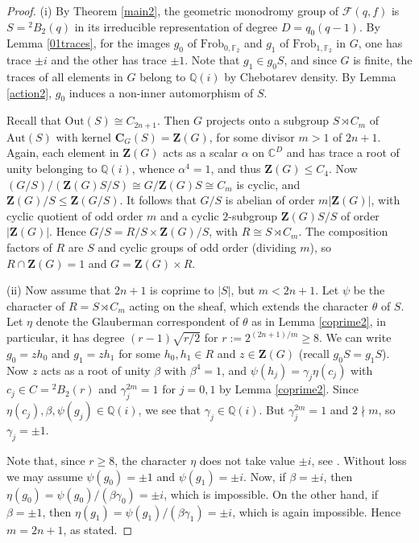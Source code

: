 \documentclass[11pt]{amsart}
\theoremstyle{plain}
\theoremstyle{definition}
\numberwithin{thm}{section}
\numberwithin{equation}{thm}
\newcommand{\al}{\alpha}
\newcommand{\Aut}{\mathrm{Aut}}
\newcommand{\Out}{\mathrm{Out}}
\newcommand{\sF}{{\mathcal F}}
\newcommand{\C}{{\mathbb C}}
\newcommand{\F}{{\mathbb F}}
\newcommand{\Q}{{\mathbb Q}}
\newcommand{\0}{\emptyset}
\newcommand{\ZB}{{\mathbf Z}}
\newcommand{\CB}{{\mathbf C}}
\newcommand{\tw}[1]{{}^#1\!}
\newcommand{\Frob}{\mathrm{Frob}}
\begin{document}
\begin{proof}
(i) By Theorem \ref{main2}, the geometric monodromy group of $\sF(q,f)$ is $S = \tw2 B_2(q)$ in its irreducible representation 
of degree $D=q_0(q-1)$. By Lemma \ref{01traces}, for the images $g_0$ of $\Frob_{0,\F_2}$ and $g_1$ of $\Frob_{1,\F_2}$ in
$G$, one has trace $\pm i$ and the other has trace $\pm 1$. Note that $g_1 \in g_0S$, and since $G$ is finite,
the traces of all elements in $G$ belong to $\Q(i)$ by Chebotarev density. 
By Lemma \ref{action2}, $g_0$ induces a non-inner automorphism of $S$. 

Recall that $\Out(S) \cong C_{2n+1}$. Then $G$ projects onto a subgroup $S \rtimes C_m$ of $\Aut(S)$ with kernel
$\CB_G(S) = \ZB(G)$, for some divisor $m > 1$ of $2n+1$. 
Again, each element in $\ZB(G)$ acts as a scalar $\al$ on $\C^D$ and has trace a root of unity belonging to 
$\Q(i)$, whence $\al^4=1$, and thus $\ZB(G) \leq C_4$. Now $(G/S)/(\ZB(G)S/S) \cong G/\ZB(G)S \cong C_m$ is cyclic, and 
$\ZB(G)/S \leq \ZB(G/S)$. It follows that $G/S$ is abelian of order $m|\ZB(G)|$, with cyclic quotient of odd order $m$ and 
a cyclic $2$-subgroup $\ZB(G)S/S$ of order $|\ZB(G)|$. Hence $G/S = R/S \times \ZB(G)/S$, with $R \cong S \rtimes C_m$.
The composition factors of $R$ are $S$ and cyclic groups of odd order (dividing $m$), so $R \cap \ZB(G)=1$ and 
$G = \ZB(G) \times R$.

\smallskip
(ii) Now assume that $2n+1$ is coprime to $|S|$, but $m < 2n+1$. Let $\psi$ be the character of $R = S \rtimes C_m$ 
acting on the sheaf, which extends the character $\theta$ of $S$. Let $\eta$ denote the Glauberman correspondent of $\theta$
as in Lemma \ref{coprime2}, in particular, it has degree $(r-1)\sqrt{r/2}$ for $r:=2^{(2n+1)/m} \geq 8$. 
We can write $g_0 = zh_0$ and $g_1 = zh_1$ for some $h_0,h_1 \in R$ and $z \in \ZB(G)$
(recall $g_0S=g_1S$). Now $z$ acts as a root of unity $\beta$ with $\beta^4=1$, and $\psi(h_j) = \gamma_j\eta(c_j)$ with
$c_j \in C = \tw2 B_2(r)$ and $\gamma_j^{2m}=1$ for $j= 0,1$ by Lemma \ref{coprime2}. Since $\eta(c_j),\beta,\psi(g_j) \in \Q(i)$, 
we see that $\gamma_j \in \Q(i)$. But $\gamma_j^{2m}=1$ and $2 \nmid m$, so $\gamma_j = \pm 1$.

Note that, since $r \geq 8$, the character $\eta$ does not take value $\pm i$, see \cite{Suz}.
Without loss we may assume $\psi(g_0) = \pm 1$ and $\psi(g_1) = \pm i$. Now, if $\beta = \pm i$, then 
$\eta(g_0) = \psi(g_0)/(\beta\gamma_0) = \pm i$, which is impossible.  
On the other hand, if $\beta = \pm 1$, then 
$\eta(g_1) = \psi(g_1)/(\beta\gamma_1) = \pm i$, which is again impossible. Hence $m=2n+1$, as stated. 


\end{proof}
\end{document}
